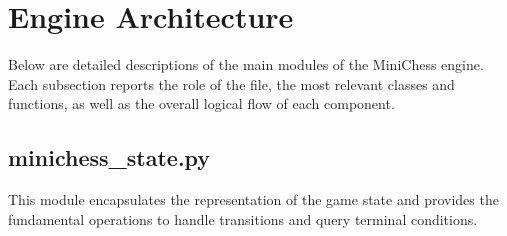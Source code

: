\documentclass{report}
\begin{document}
\section{Engine Architecture}
Below are detailed descriptions of the main modules of the MiniChess engine. Each subsection reports the role of the file, the most relevant classes and functions, as well as the overall logical flow of each component.

\subsection{minichess\_state.py}
\label{sec:minichess_state}
This module encapsulates the representation of the game state and provides the fundamental operations to handle transitions and query terminal conditions.
\end{document}
